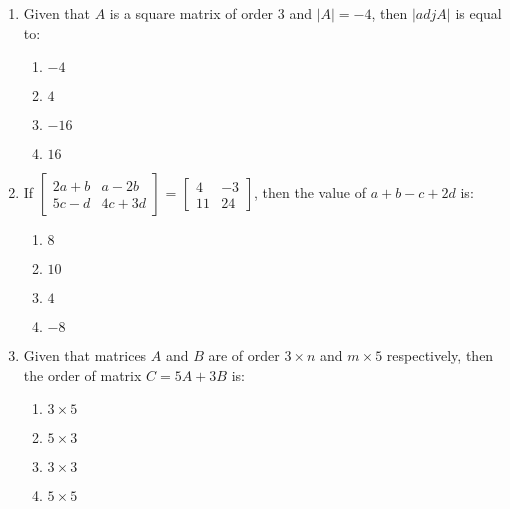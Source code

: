 \documentclass{article}
\begin{document}
\begin{enumerate}
    \item Given that $A$ is a square matrix of order $3$ and $|A| = -4$, then $| adj A |$ is equal to:
    \begin{enumerate}
        \item $-4$
        \item $4$
        \item $-16$
        \item $16$
    \end{enumerate}
    
    \item If
    $\begin{bmatrix}
      2a+b & a-2b \\
      5c-d & 4c+3d
    \end{bmatrix}$
    =
    $\begin{bmatrix}
      4 & -3 \\
      11 & 24
    \end{bmatrix}$,
    then the value of $a + b - c + 2d$ is:
    \begin{enumerate}
        \item  $8$
        \item $10$
        \item $4$ 
        \item $-8$
    \end{enumerate}

  \item Given that matrices $A$ and $B$ are of order $3 \times n$ and $m \times 5$ respectively, then the order of matrix $C = 5A + 3B$ is:
    \begin{enumerate}
        \item $ 3 \times 5$ 
        \item $ 5 \times 3$ 
        \item $ 3 \times 3$ 
        \item $ 5 \times 5$
    \end{enumerate}


\end{enumerate}
\end{document}
